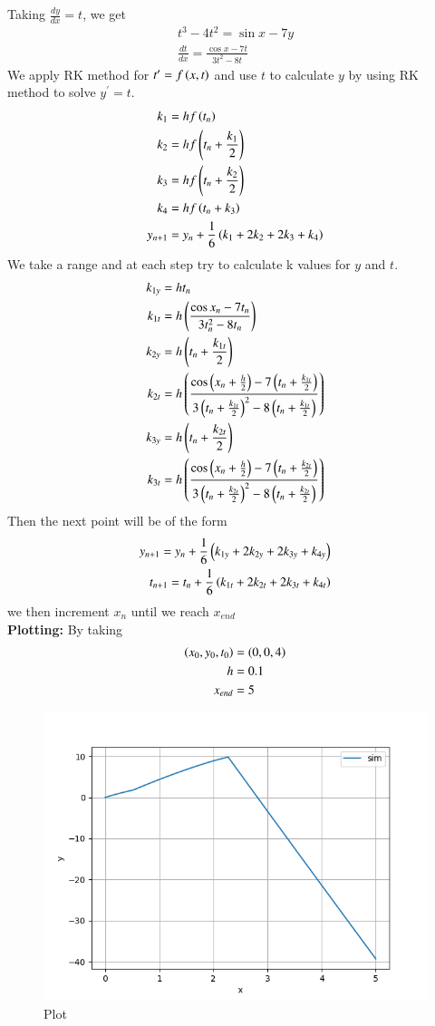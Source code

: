 \documentclass[journal]{IEEEtran}
\begin{document}
Taking $\frac{dy}{dx}=t$, we get
\begin{align}
t^3-4t^2=\sin x-7y\\
\frac{dt}{dx}=\frac{\cos x-7t}{3t^2-8t}
\end{align}
We apply RK method for $t^\prime=f\left(x,t\right)$ and use $t$ to calculate $y$ by using RK method to solve $y^\prime=t$.
\begin{align}
k_1&=hf\left(t_n\right)\\
k_2&=hf\left(t_n+\frac{k_1}{2}\right)\\
k_3&=hf\left(t_n+\frac{k_2}{2}\right)\\
k_4&=hf\left(t_n+k_3\right)\\
y_{n+1}&=y_n+\frac{1}{6}\left(k_1+2k_2+2k_3+k_4\right)\\
\end{align}
We take a range  and at each step try to calculate k values for $y$ and $t$.
\begin{align}
k_{1y}&= ht_n\\
k_{1t}&=h\left(\frac{\cos x_n-7t_n}{3t_n^2-8t_n}\right)\\
k_{2y}&= h\left(t_n+\frac{k_{1t}}{2}\right)\\
k_{2t}&=h\left(\frac{\cos \left(x_n+\frac{h}{2}\right)-7\left(t_n+\frac{k_{1t}}{2}\right)}{3\left(t_n+\frac{k_{1t}}{2}\right)^2-8\left(t_n+\frac{k_{1t}}{2}\right)}\right)\\
k_{3y}&= h\left(t_n+\frac{k_{2t}}{2}\right)\\
k_{3t}&=h\left(\frac{\cos \left(x_n+\frac{h}{2}\right)-7\left(t_n+\frac{k_{2t}}{2}\right)}{3\left(t_n+\frac{k_{2t}}{2}\right)^2-8\left(t_n+\frac{k_{2t}}{2}\right)}\right)
\end{align}
Then the next point will be of the form 
\begin{align}
y_{n+1}=y_n+\frac{1}{6}\left(k_{1y}+2k_{2y}+2k_{3y}+k_{4y}\right)\\
t_{n+1}=t_n+\frac{1}{6}\left(k_{1t}+2k_{2t}+2k_{3t}+k_{4t}\right)
\end{align}
we then increment $x_n$ until we reach $x_{end}$\\
\textbf{Plotting:}
By taking 
\begin{align}
\left(x_0,y_0,t_0\right)&=\left(0,0,4\right)\\
h&=0.1\\
x_{end}&=5
\end{align}
\begin{figure}[h!]
   \centering
   \includegraphics[width=1\columnwidth]{Figs/Figs.png}
   \caption{Plot}
\end{figure}
\end{document}

